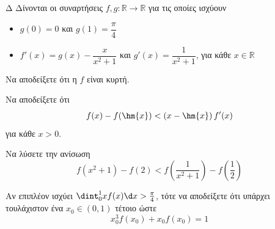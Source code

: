 \begin{thema}{Δ}
Δίνονται οι συναρτήσεις $f,g:\mathbb{R}\to\mathbb{R}$ για τις οποίες ισχύουν
\begin{itemize}
\item $g(0)=0$ και $g(1)=\dfrac{\pi}{4}$
\item $f'(x)=g(x)-\dfrac{x}{x^2+1}$ και $g'(x)=\dfrac{1}{x^2+1}$, για κάθε $x\in\mathbb{R}$
\end{itemize}
\begin{erwthma}
    \item Να αποδείξετε ότι η $f$ είναι κυρτή.
\item Να αποδείξετε ότι \[f(x)-f(\hm{x})<\left(x-\hm{x}\right)f'(x)\]
για κάθε $x>0$.
\item Να λύσετε την ανίσωση \[f\left(x^2+1\right)-f(2)<f\left(\frac{1}{x^2+1}\right)-f\left(\frac{1}{2}\right)\]
\item Αν επιπλέον ισχύει $\dint_{0}^{1}{xf(x)\d x}>\frac{\pi}{4}$, τότε να αποδείξετε ότι υπάρχει τουλάχιστον ένα $x_0\in(0,1)$ τέτοιο ώστε
\[x_0^3f(x_0)+x_0f(x_0)=1\]
\end{erwthma}
\end{thema}

